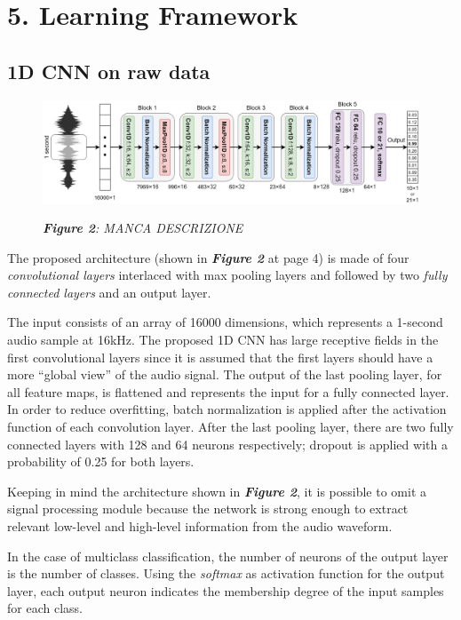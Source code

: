 \documentclass[conference]{IEEEtran}
\begin{document}
\section{5.	Learning Framework}
\subsection{1D CNN on raw data}

\begin{figure}
\centering
\includegraphics[scale=0.16]{1DCNN}

\begin{small}\textit{\textbf{Figure 2}: MANCA DESCRIZIONE}
\end{small}
\end{figure}

The proposed architecture (shown in \textbf{\textit{Figure 2}} at page 4) is made of four \textit{convolutional layers} interlaced with max pooling layers and followed by two \textit{fully connected layers} and an output layer.

The input consists of an array of 16000 dimensions, which represents a 1-second audio sample at 16kHz.
The proposed 1D CNN has large receptive fields in the first convolutional layers since it is assumed that the first layers should have a more “global view” of the audio signal. The output of the last pooling layer, for all feature maps, is flattened and represents the input for a fully connected layer. In order to reduce overfitting, batch normalization is applied after the activation function of each convolution layer. After the last pooling layer, there are two fully connected layers with 128 and 64 neurons respectively; dropout is applied with a probability of 0.25 for both layers.

Keeping in mind the architecture shown in \textbf{\textit{Figure 2}}, it is possible to omit a signal processing module because the network is strong enough to extract relevant low-level and high-level information from the audio waveform.

In the case of multiclass classification, the number of neurons of the output layer is the number of classes. Using the \textit{softmax} as activation function for the output layer, each output neuron indicates the membership degree of the input samples for each class.
\end{document}
